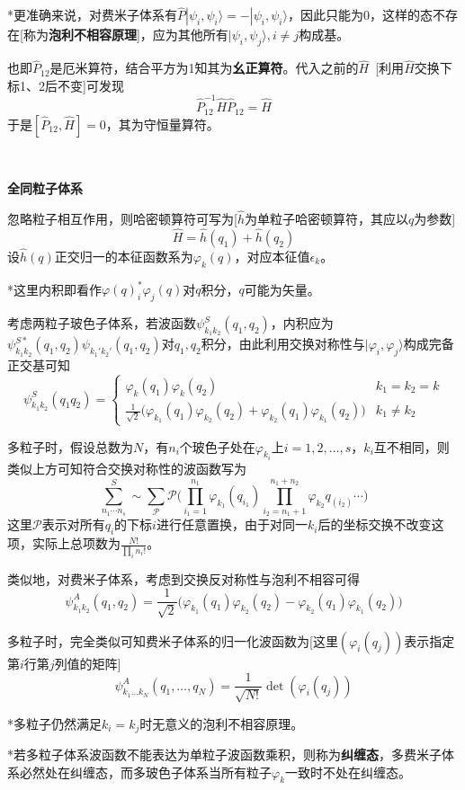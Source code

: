 \documentclass[a4paper,UTF8,fontset=windows]{ctexart}
\newcommand*{\ket}[1]{|#1\rangle}
\begin{document}
*更准确来说，对费米子体系有$\hat{P}\ket{\psi_i,\psi_i}=-\ket{\psi_i,\psi_i}$，因此只能为0，这样的态不存在[称为\textbf{泡利不相容原理}]，应为其他所有$\ket{\psi_i,\psi_j},i\ne j$构成基。

也即$\hat{P}_{12}$是厄米算符，结合平方为1知其为\textbf{幺正算符}。代入之前的$\hat{H}$\ [利用$\hat{H}$交换下标1、2后不变]可发现
$$\hat{P}_{12}^{-1}\hat{H}\hat{P}_{12}=\hat{H}$$
于是$[\hat{P}_{12},\hat{H}]=0$，其为守恒量算符。

\

\textbf{全同粒子体系}

忽略粒子相互作用，则哈密顿算符可写为[$\hat{h}$为单粒子哈密顿算符，其应以$q$为参数]
$$\hat{H}=\hat{h}(q_1)+\hat{h}(q_2)$$
设$\hat{h}(q)$正交归一的本征函数系为$\varphi_k(q)$，对应本征值$\epsilon_k$。

*这里内积即看作$\varphi(q)_i^*\varphi_j(q)$对$q$积分，$q$可能为矢量。

考虑两粒子玻色子体系，若波函数$\psi_{k_1k_2}^S(q_1,q_2)$，内积应为$\psi_{k_1k_2}^{S*}(q_1,q_2)\psi_{k_1'k_2'}(q_1,q_2)$对$q_1,q_2$积分，由此利用交换对称性与$\ket{\varphi_i,\varphi_j}$构成完备正交基可知
$$\psi_{k_1k_2}^S(q_1q_2)=\begin{cases}\varphi_k(q_1)\varphi_k(q_2)&k_1=k_2=k\\\frac{1}{\sqrt2}\big(\varphi_{k_1}(q_1)\varphi_{k_2}(q_2)+\varphi_{k_2}(q_1)\varphi_{k_1}(q_2)\big)&k_1\ne k_2\end{cases}$$

多粒子时，假设总数为$N$，有$n_i$个玻色子处在$\varphi_{k_i}$上$i=1,2,\dots,s$，$k_i$互不相同，则类似上方可知符合交换对称性的波函数写为
$$\sum_{n_1\cdots n_s}^S\sim\sum_{\mathcal{P}}\mathcal{P}\bigg(\prod_{i_1=1}^{n_1}\varphi_{k_1}(q_{i_1})\prod_{i_2=n_1+1}^{n_1+n_2}\varphi_{k_2}q_({i_2})\cdots\bigg)$$
这里$\mathcal{P}$表示对所有$q_i$的下标$i$进行任意置换，由于对同一$k_i$后的坐标交换不改变这项，实际上总项数为$\frac{N!}{\prod_in_i!}$。

类似地，对费米子体系，考虑到交换反对称性与泡利不相容可得
$$\psi_{k_1k_2}^A(q_1,q_2)=\frac{1}{\sqrt2}\big(\varphi_{k_1}(q_1)\varphi_{k_2}(q_2)-\varphi_{k_2}(q_1)\varphi_{k_1}(q_2)\big)$$

多粒子时，完全类似可知费米子体系的归一化波函数为[这里$(\varphi_i(q_j))$表示指定第$i$行第$j$列值的矩阵]
$$\psi_{k_1\dots k_N}^A(q_1,\dots,q_N)=\frac{1}{\sqrt{N!}}\det(\varphi_i(q_j))$$

*多粒子仍然满足$k_i=k_j$时无意义的泡利不相容原理。

*若多粒子体系波函数不能表达为单粒子波函数乘积，则称为\textbf{纠缠态}，多费米子体系必然处在纠缠态，而多玻色子体系当所有粒子$\varphi_k$一致时不处在纠缠态。
\end{document}
